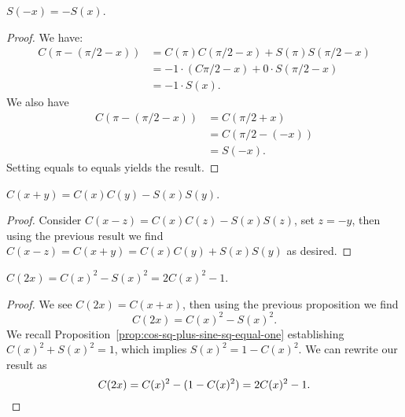 \begin{proposition}\label{prop:sine-is-odd-function}
$S(-x) = -S(x)$.
\end{proposition}
\begin{proof}
  We have:
  \begin{subequations}
    \begin{align}
      C(\pi - (\pi/2 - x))
      &= C(\pi)C(\pi/2 - x) + S(\pi)S(\pi/2 - x)\\
      &= -1\cdot(C\pi/2 - x) + 0\cdot S(\pi/2 - x)\\
      &= -1\cdot S(x).
    \end{align}
  \end{subequations}
  We also have
  \begin{subequations}
    \begin{align}
      C(\pi - (\pi/2 - x))
      &= C(\pi/2 + x)\\
      &= C(\pi/2 - (-x))\\
      &= S(-x).
    \end{align}
  \end{subequations}
  Setting equals to equals yields the result.
\end{proof}

\begin{proposition}
$C(x+y) = C(x)C(y) - S(x)S(y)$.
\end{proposition}
\begin{proof}
Consider $C(x-z)=C(x)C(z)-S(x)S(z)$, set $z=-y$, then using the previous
result we find $C(x-z)=C(x+y)=C(x)C(y)+S(x)S(y)$ as desired.
\end{proof}

\begin{proposition}
$C(2x) = C(x)^{2} - S(x)^{2} = 2C(x)^{2} - 1$.
\end{proposition}

\begin{proof}
  We see $C(2x)=C(x+x)$, then using the previous proposition we find
  \begin{equation}
C(2x) = C(x)^{2} - S(x)^{2}.
  \end{equation}
  We recall Proposition~\ref{prop:cos-sq-plus-sine-sq-equal-one}
  establishing $C(x)^{2} + S(x)^{2} = 1$, which implies
  $S(x)^{2} = 1 - C(x)^{2}$. We can rewrite our result as
  \begin{equation*}
C(2x) = C(x)^{2} - (1 - C(x)^{2}) = 2C(x)^{2} - 1.\qedhere
  \end{equation*}
\end{proof}

